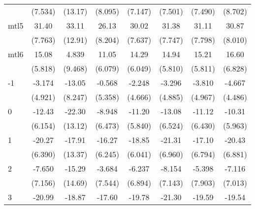 \documentclass{article}
\begin{document}
{\begin{longtable}{l*{7}{c}}
                &  (7.534)         &  (13.17)         &  (8.095)         &  (7.147)         &  (7.501)         &  (7.490)         &  (8.702)         \\
mtl5            &    31.40\sym{***}&    33.11\sym{*}  &    26.13\sym{**} &    30.02\sym{***}&    31.38\sym{***}&    31.11\sym{***}&    30.87\sym{***}\\
                &  (7.763)         &  (12.91)         &  (8.204)         &  (7.637)         &  (7.747)         &  (7.798)         &  (8.010)         \\
mtl6            &    15.08\sym{*}  &    4.839         &    11.05         &    14.29\sym{*}  &    14.94\sym{*}  &    15.21\sym{*}  &    16.60\sym{*}  \\
                &  (5.818)         &  (9.468)         &  (6.079)         &  (6.049)         &  (5.810)         &  (5.811)         &  (6.828)         \\
-1              &   -3.174         &   -13.05         &   -0.568         &   -2.248         &   -3.296         &   -3.810         &   -4.667         \\
                &  (4.921)         &  (8.247)         &  (5.358)         &  (4.666)         &  (4.885)         &  (4.967)         &  (4.486)         \\
0               &   -12.43         &   -22.30         &   -8.948         &   -11.20         &   -13.08         &   -11.12         &   -10.31         \\
                &  (6.154)         &  (13.12)         &  (6.473)         &  (5.840)         &  (6.524)         &  (6.430)         &  (5.963)         \\
1               &   -20.27\sym{**} &   -17.91         &   -16.27\sym{*}  &   -18.85\sym{**} &   -21.31\sym{**} &   -17.10\sym{*}  &   -20.43\sym{**} \\
                &  (6.390)         &  (13.37)         &  (6.245)         &  (6.041)         &  (6.960)         &  (6.794)         &  (6.881)         \\
2               &   -7.650         &   -15.29         &   -3.684         &   -6.237         &   -8.154         &   -5.398         &   -7.116         \\
                &  (7.156)         &  (14.69)         &  (7.544)         &  (6.894)         &  (7.143)         &  (7.903)         &  (7.013)         \\
3               &   -20.99\sym{**} &   -18.87         &   -17.60\sym{*}  &   -19.78\sym{**} &   -21.30\sym{**} &   -19.59\sym{**} &   -19.54\sym{*}  \\

\end{longtable}}
\end{document}
